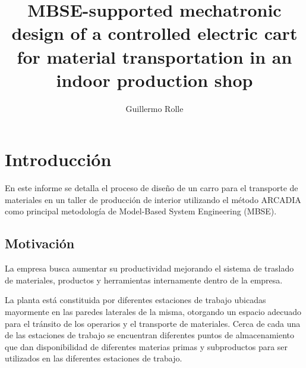 


\usepackage[spanish]{babel}
\usepackage{dirtytalk}
\usepackage{todonotes}
\usepackage{hyperref}
\usepackage{graphicx}
\usepackage{float}

\title{MBSE-supported mechatronic design of a controlled electric cart for material transportation in an indoor production shop}
\author{Guillermo Rolle}








\renewcommand{\thepage}{\roman{page}}

\todototoc

\tableofcontents 
\cleardoublepage
{}%
\section{Introducción}\label{sec:intro}

En este informe se detalla el proceso de diseño de un carro para el transporte de materiales en un taller de producción de interior utilizando el método ARCADIA \cite{voirin_model-based_2018} como principal metodología de Model-Based System Engineering (MBSE). 

\subsection{Motivación}\label{sec:motivacion}
La empresa busca aumentar su productividad mejorando el sistema de traslado de materiales, productos y herramientas internamente dentro de la empresa. 

La planta está constituida por diferentes estaciones de trabajo ubicadas mayormente en las paredes laterales de la misma, otorgando un espacio adecuado para el tránsito de los operarios y el transporte de materiales.  Cerca de cada una de las estaciones de trabajo se encuentran diferentes puntos de almacenamiento que dan disponibilidad de diferentes materias primas y subproductos para ser utilizados en las diferentes estaciones de trabajo.

